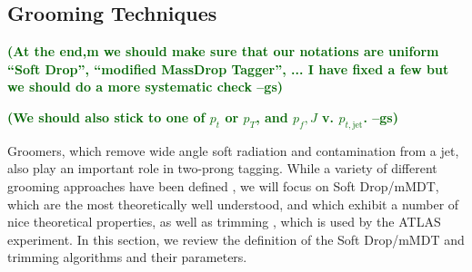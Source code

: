 \documentclass[11pt,letterpaper]{article}
\newcommand{\gs}[1]{\textbf{\textcolor{darkgreen}{(#1 --gs)}}}
\begin{document}
\subsection{Grooming Techniques}\label{sec:groom_tech}

\gs{At the end,m we should make sure that our notations are uniform
  ``Soft Drop'', ``modified MassDrop Tagger'', ... I have fixed a few
  but we should do a more systematic check}

\gs{We should also stick to one of $p_t$ or $p_T$, and $p_f,J$
  v. $p_{t,\text{jet}}$.}

Groomers, which remove wide angle soft radiation and contamination from a jet, also play an important role in two-prong tagging. While a variety of different grooming approaches have been defined \cite{Butterworth:2008iy,Ellis:2009su,Ellis:2009me,Krohn:2009th,Dasgupta:2013via,Dasgupta:2013ihk}, we will focus on Soft Drop/mMDT, which are the most theoretically well understood, and which exhibit a number of nice theoretical properties, as well as trimming \cite{Krohn:2009th}, which is used by the ATLAS experiment. In this section, we review the definition of the Soft Drop/mMDT and trimming algorithms and their parameters.
\end{document}
